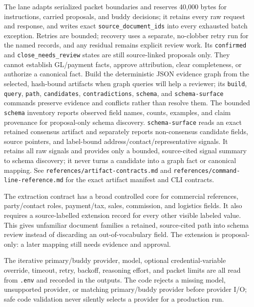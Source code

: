\documentclass[
]{article}
\begin{document}
The lane adapts serialized packet boundaries and reserves 40,000 bytes
for instructions, carried proposals, and buddy decisions; it retains
every raw request and response, and writes exact
\texttt{source\_\allowbreak{}document\_\allowbreak{}ids} into every
exhausted batch exception. Retries are bounded; recovery uses a
separate, no-clobber retry run for the named records, and any residual
remains explicit review work. Its \texttt{confirmed} and
\texttt{close\_\allowbreak{}needs\_\allowbreak{}review} states are still
source-linked proposals only. They cannot establish GL/payment facts,
approve attribution, clear completeness, or authorize a canonical fact.
Build the deterministic JSON evidence graph from the selected,
hash-bound artifacts when graph queries will help a reviewer; its
\texttt{build}, \texttt{query}, \texttt{path}, \texttt{candidates},
\texttt{contradictions}, \texttt{schema}, and \texttt{schema-surface}
commands preserve evidence and conflicts rather than resolve them. The
bounded \texttt{schema} inventory reports observed field names, counts,
examples, and claim provenance for proposal-only schema discovery.
\texttt{schema-surface} reads an exact retained consensus artifact and
separately reports non-consensus candidate fields, source pointers, and
label-bound address/contact/representative signals. It retains all raw
signals and provides only a bounded, source-cited signal summary to
schema discovery; it never turns a candidate into a graph fact or
canonical mapping. See
\texttt{references/\allowbreak{}artifact-\allowbreak{}contracts.md} and
\texttt{references/\allowbreak{}command-\allowbreak{}line-\allowbreak{}reference.md}
for the exact artifact manifest and CLI contracts.

The extraction contract has a broad controlled core for commercial
references, party/contact roles, payment/tax, sales, commission, and
logistics fields. It also requires a source-labelled extension record
for every other visible labeled value. This gives unfamiliar document
families a retained, source-cited path into schema review instead of
discarding an out-of-vocabulary field. The extension is proposal-only: a
later mapping still needs evidence and approval.

The iterative primary/buddy provider, model, optional
credential-variable override, timeout, retry, backoff, reasoning effort,
and packet limits are all read from \texttt{.env} and recorded in the
outputs. The code rejects a missing model, unsupported provider, or
matching primary/buddy provider before provider I/O; safe code
validation never silently selects a provider for a production run.
\end{document}
